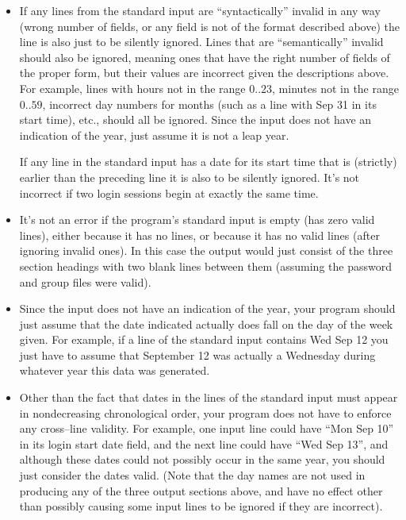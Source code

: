 \documentclass[11pt]{article}
\begin{document}
\begin{itemize}
          \item If any lines from the standard input are ``syntactically''
                invalid in any way (wrong number of fields, or any field is
                not of the format described above) the line is also just to
                be silently ignored.  Lines that are ``semantically''
                invalid should also be ignored, meaning ones that have the
                right number of fields of the proper form, but their values
                are incorrect given the descriptions above.  For example,
                lines with hours not in the range $0..23$, minutes not in
                the range $0..59$, incorrect day numbers for months (such as
                a line with Sep 31 in its start time), etc., should all be
                ignored.  Since the input does not have an indication of the
                year, just assume it is not a leap year.

                If any line in the standard input has a date for its start
                time that is (strictly) earlier than the preceding line it
                is also to be silently ignored.  It's not incorrect if two
                login sessions begin at exactly the same time.

          \item It's not an error if the program's standard input is empty
                (has zero valid lines), either because it has no lines, or
                because it has no valid lines (after ignoring invalid ones).
                In this case the output would just consist of the three
                section headings with two blank lines between them (assuming
                the password and group files were valid).

                \enlargethispage{3mm}

          \item Since the input does not have an indication of the year,
                your program should just assume that the date indicated
                actually does fall on the day of the week given.  For
                example, if a line of the standard input contains Wed Sep 12
                you just have to assume that September 12 was actually a
                Wednesday during whatever year this data was generated.

          \item Other than the fact that dates in the lines of the standard
                input must appear in nondecreasing chronological order, your
                program does not have to enforce any cross--line validity.
                For example, one input line could have ``Mon Sep 10'' in its
                login start date field, and the next line could have ``Wed
                Sep 13'', and although these dates could not possibly occur
                in the same year, you should just consider the dates valid.
                (Note that the day names are not used in producing any of
                the three output sections above, and have no effect other
                than possibly causing some input lines to be ignored if they
                are incorrect).

        \end{itemize}
\end{document}
